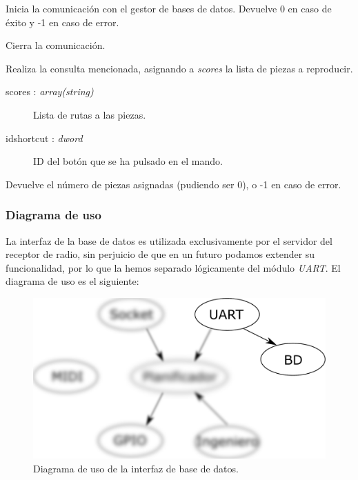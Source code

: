 \begin{description}[style=nextline]
	\item[db\_init () : \textit{dword}]
	Inicia la comunicación con el gestor de bases de datos. Devuelve 0 en caso de éxito y -1 en caso de error.
	
	\item[db\_destroy ()]
	Cierra la comunicación.
	
	\item[db\_query (scores, idshortcut) : \textit{dword}]
	Realiza la consulta mencionada, asignando a \textit{scores} la lista de piezas a reproducir.
	
	\begin{description}
		\item[scores : \textit{array(string)}] Lista de rutas a las piezas.
		\item[idshortcut : \textit{dword}] ID del botón que se ha pulsado en el mando.
	\end{description}
	
	Devuelve el número de piezas asignadas (pudiendo ser 0), o -1 en caso de error.
	
\end{description}

\subsubsection{Diagrama de uso}

La interfaz de la base de datos es utilizada exclusivamente por el servidor del receptor de radio, sin perjuicio de que en un futuro podamos extender su funcionalidad, por lo que la hemos separado lógicamente del módulo \textit{UART}. El diagrama de uso es el siguiente:

\smallskip

\begin{figure}[H]
	\noindent \begin{centering}
		\includegraphics[width=\linewidth/2]{capitulo4/daemon_bd}
		\par\end{centering}
	\smallskip
	\caption{\label{fig:daemon_bd} Diagrama de uso de la interfaz de base de datos.}
\end{figure} 

